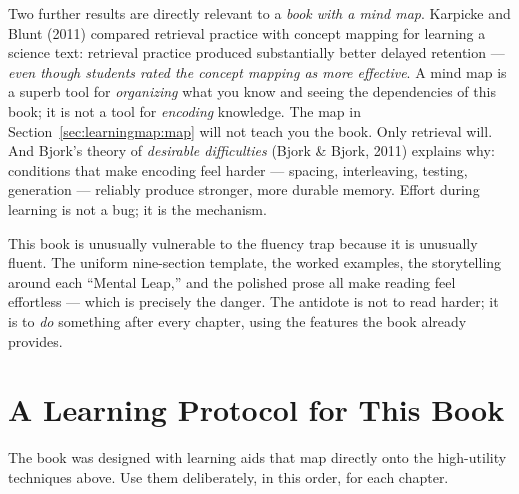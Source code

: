 Two further results are directly relevant to a \emph{book with a mind map}. Karpicke and Blunt (2011) compared retrieval practice with concept mapping for learning a science text: retrieval practice produced substantially better delayed retention --- \emph{even though students rated the concept mapping as more effective}. A mind map is a superb tool for \emph{organizing} what you know and seeing the dependencies of this book; it is not a tool for \emph{encoding} knowledge. The map in Section~\ref{sec:learningmap:map} will not teach you the book. Only retrieval will. And Bjork's theory of \emph{desirable difficulties} (Bjork \& Bjork, 2011) explains why: conditions that make encoding feel harder --- spacing, interleaving, testing, generation --- reliably produce stronger, more durable memory. Effort during learning is not a bug; it is the mechanism.  

This book is unusually vulnerable to the fluency trap because it is unusually fluent. The uniform nine-section template, the worked examples, the storytelling around each ``Mental Leap,'' and the polished prose all make reading feel effortless --- which is precisely the danger. The antidote is not to read harder; it is to \emph{do} something after every chapter, using the features the book already provides.

\section{A Learning Protocol for This Book}
\label{sec:learningmap:protocol}

The book was designed with learning aids that map directly onto the high-utility techniques above. Use them deliberately, in this order, for each chapter. 

